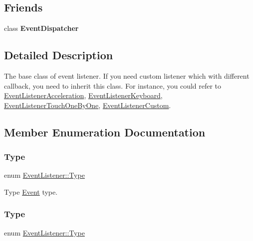 \subsection*{Friends}
\begin{DoxyCompactItemize}
\item 
\mbox{\label{classEventListener_a7de0ed02fc316d9e73b7eb3def69c105}} 
class {\bfseries Event\+Dispatcher}
\end{DoxyCompactItemize}


\subsection{Detailed Description}
The base class of event listener. If you need custom listener which with different callback, you need to inherit this class. For instance, you could refer to \hyperlink{classEventListenerAcceleration}{Event\+Listener\+Acceleration}, \hyperlink{classEventListenerKeyboard}{Event\+Listener\+Keyboard}, \hyperlink{classEventListenerTouchOneByOne}{Event\+Listener\+Touch\+One\+By\+One}, \hyperlink{classEventListenerCustom}{Event\+Listener\+Custom}. 

\subsection{Member Enumeration Documentation}
\mbox{\label{classEventListener_ab78e6acdfa2343490eda9e92d1555ee4}} 
\subsubsection{\texorpdfstring{Type}{Type}\hspace{0.1cm}{\footnotesize\ttfamily [1/2]}}
{\footnotesize\ttfamily enum \hyperlink{classEventListener_ab78e6acdfa2343490eda9e92d1555ee4}{Event\+Listener\+::\+Type}\hspace{0.3cm}{\ttfamily [strong]}}

Type \hyperlink{classEvent}{Event} type. \mbox{\label{classEventListener_ab78e6acdfa2343490eda9e92d1555ee4}} 
\subsubsection{\texorpdfstring{Type}{Type}\hspace{0.1cm}{\footnotesize\ttfamily [2/2]}}
{\footnotesize\ttfamily enum \hyperlink{classEventListener_ab78e6acdfa2343490eda9e92d1555ee4}{Event\+Listener\+::\+Type}\hspace{0.3cm}{\ttfamily [strong]}}

